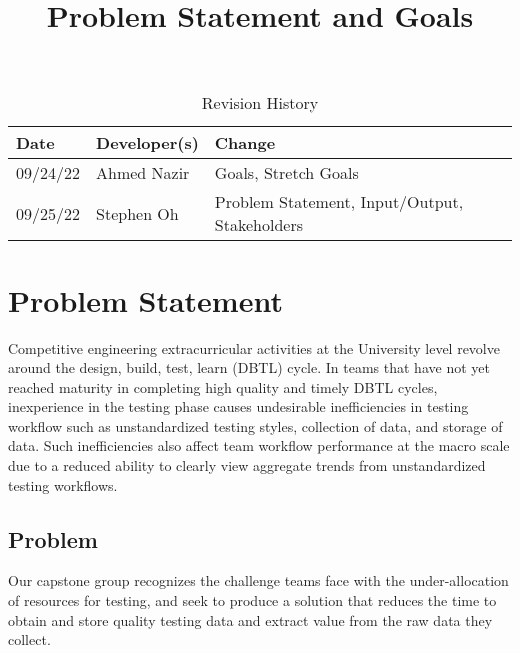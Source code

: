 \documentclass{article}
\title{Problem Statement and Goals\\\progname}
\author{\authname}
\date{}
\begin{document}
\maketitle

\begin{table}[hp]
\caption{Revision History} \label{TblRevisionHistory}
\begin{tabularx}{\textwidth}{llX}
\toprule
\textbf{Date} & \textbf{Developer(s)} & \textbf{Change}\\
\midrule
09/24/22 & Ahmed Nazir & Goals, Stretch Goals\\
09/25/22 & Stephen Oh & Problem Statement, Input/Output, Stakeholders\\
\bottomrule
\end{tabularx}
\end{table}

\section{Problem Statement}

Competitive engineering extracurricular activities at the University level revolve around the design, build,
test, learn (DBTL) cycle. In teams that have not yet reached maturity in completing high quality and
timely DBTL cycles, inexperience in the testing phase causes undesirable inefficiencies in testing
workflow such as unstandardized testing styles, collection of data, and storage of data. Such
inefficiencies also affect team workflow performance at the macro scale due to a reduced ability to
clearly view aggregate trends from unstandardized testing workflows. \newpage

\subsection{Problem}

Our capstone group recognizes the challenge teams face with the under-allocation of resources for testing, and seek to produce a solution that reduces the time to obtain and store quality testing data and extract value from the raw data they collect. \\ 
\end{document}
